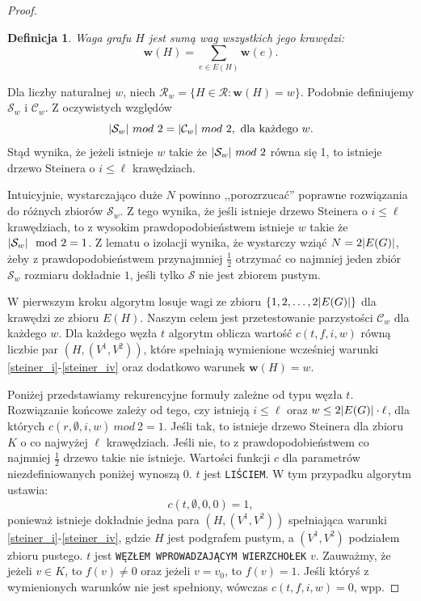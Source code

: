 \documentclass[12pt, oneside]{report}
\newtheorem{definition}{Definicja}
\begin{document}
\begin{proof}
\begin{definition}
\em \emph{Waga grafu $H$} jest sumą wag wszystkich jego krawędzi:
$$\mathbf{w}(H) = \sum_{e \in E(H)} \mathbf{w}(e).$$
\end{definition}
Dla liczby naturalnej $w$, niech $\mathcal{R}_w = \{H \in \mathcal{R} : \mathbf{w}(H) = w\}$. Podobnie definiujemy $\mathcal{S}_w$ i $\mathcal{C}_w$. Z oczywistych względów $$\abs{\mathcal{S}_w} \ mod \ 2 = \abs{\mathcal{C}_w} \ mod \ 2, \ \text{dla każdego} \ w.$$ Stąd wynika, że jeżeli istnieje $w$ takie że $\abs{\mathcal{S}_w} \ mod \ 2$ równa się 1, to istnieje drzewo Steinera o $i \leq \ell$ krawędziach.

Intuicyjnie, wystarczająco duże $N$ powinno ,,porozrzucać'' poprawne rozwiązania do różnych zbiorów $\mathcal{S}_w$. Z tego wynika, że jeśli istnieje drzewo Steinera o $i \leq \ell$ krawędziach, to z wysokim prawdopodobieństwem istnieje $w$ takie że $\abs{\mathcal{S}_w} \mod 2 = 1$. Z lematu o izolacji wynika, że wystarczy wziąć $N = 2\abs{E(G)}$, żeby z prawdopodobieństwem przynajmniej $\frac{1}{2}$ otrzymać co najmniej jeden zbiór $\mathcal{S}_w$ rozmiaru dokładnie $1$, jeśli tylko $\mathcal{S}$ nie jest zbiorem pustym.

W pierwszym kroku algorytm losuje wagi ze zbioru $\{1,2, \ldots, 2 \abs{E(G)}\}$ dla krawędzi ze zbioru $E(H)$. Naszym celem jest przetestowanie parzystości $\mathcal{C}_w$ dla każdego $w$. Dla każdego węzła $t$ algorytm oblicza wartość $c(t, f, i, w)$ równą liczbie par $(H, (V^1, V^2))$, które spełniają wymienione wcześniej warunki \ref{steiner_i}-\ref{steiner_iv} oraz dodatkowo warunek $\mathbf{w}(H) = w$.

Poniżej przedstawiamy rekurencyjne formuły zależne od typu węzła $t$. Rozwiązanie końcowe zależy od tego, czy istnieją $i \leq \ell$ oraz $w  \leq 2\abs{E(G)} \cdot \ell$, dla których  $c(r,\emptyset,i,w) \ mod \ 2 = 1$. Jeśli tak, to istnieje drzewo Steinera dla zbioru $K$ o co najwyżej $\ell$ krawędziach. Jeśli nie, to z prawdopodobieństwem co najmniej $\frac{1}{2}$ drzewo takie nie istnieje. Wartości funkcji $c$ dla parametrów niezdefiniowanych poniżej wynoszą $0$.
\newline\newline
$t$ jest \texttt{LIŚCIEM}. W tym przypadku algorytm ustawia:
$$c(t,\emptyset,0,0) = 1,$$ ponieważ istnieje dokładnie jedna para $(H, (V^1, V^2))$ spełniająca warunki \ref{steiner_i}-\ref{steiner_iv}, gdzie $H$ jest podgrafem pustym, a $(V^1, V^2)$ podziałem zbioru pustego.
\newline\newline
$t$ jest \texttt{WĘZŁEM WPROWADZAJĄCYM WIERZCHOŁEK} $v$. Zauważmy, że jeżeli $v \in K$, to $f(v) \neq 0$ oraz jeżeli $v = v_0$, to $f(v) = 1$. Jeśli któryś z wymienionych warunków nie jest spełniony, wówczas $c(t,f,i,w) = 0$, wpp.


\end{proof}
\end{document}
